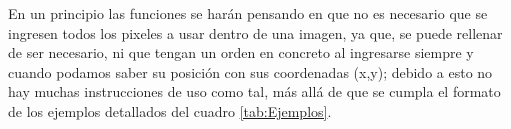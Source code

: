 En un principio las funciones se harán pensando en que no es necesario que se ingresen todos 
los pixeles a usar dentro de una imagen, ya que, se puede rellenar de ser necesario, ni que 
tengan un orden en concreto al ingresarse siempre y cuando podamos saber su posición con sus coordenadas 
(x,y); debido a esto no hay muchas instrucciones de uso como tal, más allá de que se cumpla el formato 
de los ejemplos detallados del cuadro \ref{tab:Ejemplos}.